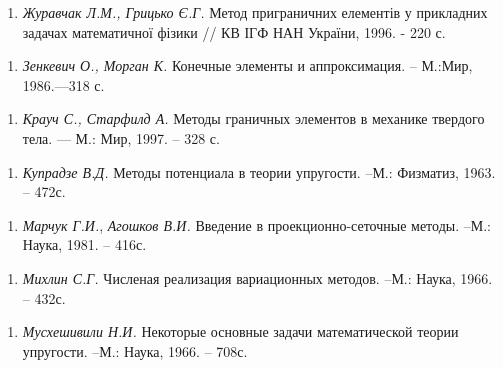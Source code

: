 \begin{enumerate}
\def\labelenumi{\arabic{enumi}.}
\tightlist
\item
  \emph{ }\protect\hypertarget{anchor-24}{}{}\emph{Журавчак Л.М.,
  Грицько Є.Г.} Метод приграничних елементів у прикладних задачах
  математичної фізики // КВ ІГФ НАН України, 1996. - 220 с.
\end{enumerate}

\begin{enumerate}
\def\labelenumi{\arabic{enumi}.}
\tightlist
\item
  \emph{ Зенкевич О., Морган К. }Конечные элементы и аппроксимация. --
  М.:Мир, 1986.---318 с.
\end{enumerate}

\begin{enumerate}
\def\labelenumi{\arabic{enumi}.}
\tightlist
\item
  \emph{ }\protect\hypertarget{anchor-8}{}{}\emph{Крауч С., Старфилд А.}
  Методы граничных элементов в механике твердого тела. --- М.: Мир,
  1997. -- 328 с.
\end{enumerate}

\begin{enumerate}
\def\labelenumi{\arabic{enumi}.}
\tightlist
\item
  \protect\hypertarget{anchor-11}{}{}\emph{Купрадзе В.Д.} Методы
  потенциала в теории упругости. --М.: Физматиз, 1963. -- 472с.
\end{enumerate}

\begin{enumerate}
\def\labelenumi{\arabic{enumi}.}
\tightlist
\item
  \emph{Марчук Г.И.}, \emph{Агошков В.И.} Введение в
  проекционно-сеточные методы. --М.: Наука, 1981. -- 416с.
\end{enumerate}

\begin{enumerate}
\def\labelenumi{\arabic{enumi}.}
\tightlist
\item
  \protect\hypertarget{anchor-9}{}{}\emph{Михлин С.Г.} Численая
  реализация вариационных методов. --М.: Наука, 1966. -- 432с.
\end{enumerate}

\begin{enumerate}
\def\labelenumi{\arabic{enumi}.}
\tightlist
\item
  \protect\hypertarget{anchor-10}{}{}\emph{Мусхешивили Н.И.} Некоторые
  основные задачи математической теории упругости. --М.: Наука, 1966. --
  708с.
\end{enumerate}

